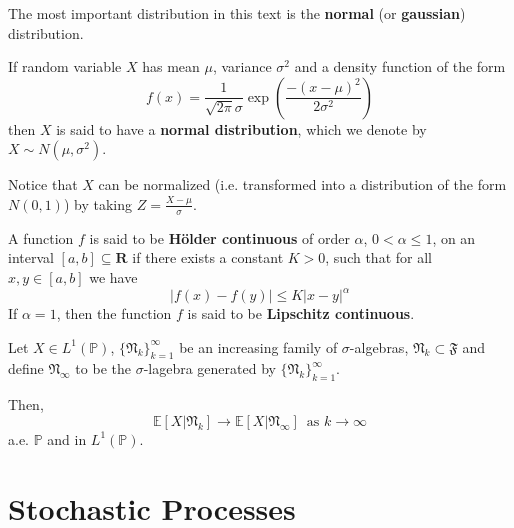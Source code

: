 
The most important distribution in this text is the \textbf{normal} (or \textbf{gaussian}) distribution.
 
\begin{definition}
	If random variable $X$ has mean $\mu$, variance $\sigma^2$ and a density function of the form
	\[
		f(x) = \frac{1}{\sqrt{2\pi} \sigma} \exp \left( \frac{-(x-\mu)^2}{2\sigma^2} \right) 
	\]
	then $X$ is said to have a \textbf{normal distribution}, which we denote by $X \sim N(\mu, \sigma^2)$.
\end{definition}

Notice that $X$ can be normalized (i.e. transformed into a distribution of the form $N(0,1)$) by taking $Z = \frac{X-\mu}{\sigma}$.


\begin{definition}
	A function $f$ is said to be \textbf{H\"older continuous} of order $\alpha$, $0 < \alpha \leq 1$, on an interval $[a,b] \subseteq \textbf{R}$ if there exists a constant $K > 0$, such that for all $x,y \in [a,b]$ we have
	\[
		|f(x) - f(y)| \leq K |x-y|^{\alpha}
	\]
	If $\alpha = 1$, then the function $f$ is said to be \textbf{Lipschitz continuous}.
\end{definition}

\begin{corollary}%
	Let $X \in L^1(\mathbb{P})$, $\{ \mathfrak{N}_k \}_{k=1}^\infty$ be an increasing family of $\sigma$-algebras, $\mathfrak{N}_k \subset \mathfrak{F}$ and define $\mathfrak{N}_\infty$ to be the $\sigma$-lagebra generated by $\{ \mathfrak{N}_k \}_{k=1}^\infty$.

	Then,
	\begin{equation*}
		\mathbb{E}[X | \mathfrak{N}_k] \longrightarrow \mathbb{E}[X | \mathfrak{N}_\infty] \, \text{ as } k \to \infty
	\end{equation*}
	a.e. $\mathbb{P}$ and in $L^1(\mathbb{P})$.
\end{corollary}

\section{Stochastic Processes}

